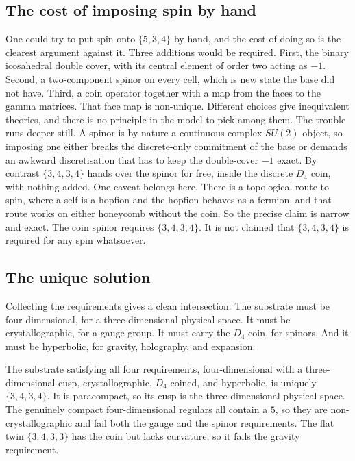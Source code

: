 \subsection{The cost of imposing spin by hand}

One could try to put spin onto $\{5,3,4\}$ by hand, and the cost of doing so is the clearest argument against it.
Three additions would be required. First, the binary icosahedral double cover, with its central element of order
two acting as $-1$. Second, a two-component spinor on every cell, which is new state the base did not have.
Third, a coin operator together with a map from the faces to the gamma matrices. That face map is non-unique.
Different choices give inequivalent theories, and there is no principle in the model to pick among them. The
trouble runs deeper still. A spinor is by nature a continuous complex $SU(2)$ object, so imposing one either
breaks the discrete-only commitment of the base or demands an awkward discretisation that has to keep the
double-cover $-1$ exact. By contrast $\{3,4,3,4\}$ hands over the spinor for free, inside the discrete $D_4$ coin,
with nothing added. One caveat belongs here. There is a topological route to spin, where a self is a
hopfion and the hopfion behaves as a fermion, and that route works on either honeycomb without the coin. So the
precise claim is narrow and exact. The coin spinor requires $\{3,4,3,4\}$. It is not claimed that $\{3,4,3,4\}$
is required for any spin whatsoever.

\subsection{The unique solution}

Collecting the requirements gives a clean intersection. The substrate must be four-dimensional, for a
three-dimensional physical space. It must be crystallographic, for a gauge group. It must carry the $D_4$ coin,
for spinors. And it must be hyperbolic, for gravity, holography, and expansion.

\begin{theorem}
The substrate satisfying all four requirements, four-dimensional with a three-dimensional cusp, crystallographic,
$D_4$-coined, and hyperbolic, is uniquely $\{3,4,3,4\}$. It is paracompact, so its cusp is the three-dimensional
physical space. The genuinely compact four-dimensional regulars all contain a $5$, so they are
non-crystallographic and fail both the gauge and the spinor requirements. The flat twin $\{3,4,3,3\}$ has the
coin but lacks curvature, so it fails the gravity requirement.
\end{theorem}

